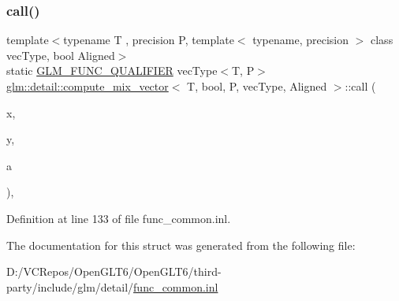 \subsubsection{\texorpdfstring{call()}{call()}}
{\footnotesize\ttfamily template$<$typename T , precision P, template$<$ typename, precision $>$ class vec\+Type, bool Aligned$>$ \\
static \mbox{\hyperlink{setup_8hpp_a33fdea6f91c5f834105f7415e2a64407}{G\+L\+M\+\_\+\+F\+U\+N\+C\+\_\+\+Q\+U\+A\+L\+I\+F\+I\+ER}} vec\+Type$<$T, P$>$ \mbox{\hyperlink{structglm_1_1detail_1_1compute__mix__vector}{glm\+::detail\+::compute\+\_\+mix\+\_\+vector}}$<$ T, bool, P, vec\+Type, Aligned $>$\+::call (\begin{DoxyParamCaption}\item[{vec\+Type$<$ T, P $>$ const \&}]{x,  }\item[{vec\+Type$<$ T, P $>$ const \&}]{y,  }\item[{vec\+Type$<$ bool, P $>$ const \&}]{a }\end{DoxyParamCaption})\hspace{0.3cm}{\ttfamily [inline]}, {\ttfamily [static]}}



Definition at line 133 of file func\+\_\+common.\+inl.



The documentation for this struct was generated from the following file\+:\begin{DoxyCompactItemize}
\item 
D\+:/\+V\+C\+Repos/\+Open\+G\+L\+T6/\+Open\+G\+L\+T6/third-\/party/include/glm/detail/\mbox{\hyperlink{func__common_8inl}{func\+\_\+common.\+inl}}\end{DoxyCompactItemize}
